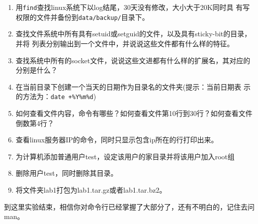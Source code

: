 \documentclass[12pt]{article}
\begin{document}
\begin{CJK*}{UTF8}{gbsn}
\begin{enumerate}[(1)]
	\item 用\lstinline{find}查找linux系统下以log结尾，30天没有修改，大小大于20K同时具
		有写权限的文件并备份到\lstinline{data/backup/}目录下。
	\item 查找文件系统中所有具有setuid或setguid的文件，以及具有sticky-bit的目录，并将
		列表分别输出到一个文件中，并说说这些文件都有什么样的特征。
	\item 查找系统中所有的socket文件，说说这些文进都有什么样的扩展名，其对应的分别是什么？
	\item 在当前目录下创建一个当天的日期作为目录名的文件夹(提示：当前日期表
		示的方法为：\lstinline{date +%Y%m%d})
	\item 如何查看文件内容，命令有哪些？如何查看文件第10行到30行？如何查看文件倒数第4行？
	\item 查看linux服务器IP的命令，同时只显示包含ip所在的行打印出来。
	\item 为计算机添加普通用户test，设定该用户的家目录并将该用户加入root组
	\item 删除用户test，同时删除其目录。
	\item 将文件夹lab1打包为lab1.tar.gz或者lab1.tar.bz2。
\end{enumerate}

到这里实验结束，相信你对命令行已经掌握了大部分了，还有不明白的，记住去问man。

\end{CJK*}
\end{document}
